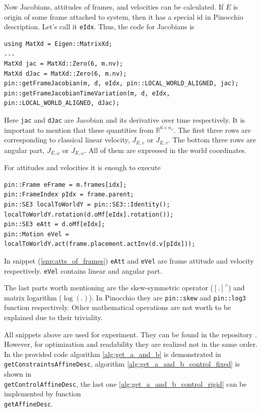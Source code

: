 Now Jacobians, attitudes of frames, and velocities can be calculated. If $E$ is 
origin of some frame attached to system, then it has a special id in Pinocchio 
description. Let's call it \texttt{eIdx}. Thus, the code for Jacobians is

\begin{lstlisting}[caption={Jacobians}, label=snp:jacs]
using MatXd = Eigen::MatrixXd;
...
MatXd jac = MatXd::Zero(6, m.nv);
MatXd dJac = MatXd::Zero(6, m.nv);
pin::getFrameJacobian(m, d, eIdx, pin::LOCAL_WORLD_ALIGNED, jac);
pin::getFrameJacobianTimeVariation(m, d, eIdx, pin::LOCAL_WORLD_ALIGNED, dJac);
\end{lstlisting}

Here \texttt{jac} and \texttt{dJac} are Jacobian and its derivative over time 
respectively. It is important to mention that these quantities from 
$\mathbb{R}^{6 \times n_v}$. The first three rows are corresponding to 
classical linear velocity, $J_{E,v}$ or $\dot{J}_{E,v}$. The bottom three rows are 
angular part, $J_{E,\omega}$ or $\dot{J}_{E,\omega}$. All of them are expressed 
in the world coordinates.

For attitudes and velocities it is enough to execute

\begin{lstlisting}[caption={Attitudes of frames}, label=snp:atts_of_frames]
pin::Frame eFrame = m.frames[idx];
pin::FrameIndex pIdx = frame.parent;
pin::SE3 localToWorldY = pin::SE3::Identity();
localToWorldY.rotation(d.oMf[eIdx].rotation());
pin::SE3 eAtt = d.oMf[eIdx]; 
pin::Motion eVel = localToWorldY.act(frame.placement.actInv(d.v[pIdx]));
\end{lstlisting}

In snippet (\ref{snp:atts_of_frames}) \texttt{eAtt} and \texttt{eVel} are 
frame attitude and velocity respectively. \texttt{eVel} contains linear and 
angular part.

The last parts worth mentioning are the skew-symmetric operator ($[.]^{\wedge}$) 
and matrix logarithm ($\log (.)$). In Pinocchio they are \texttt{pin::skew} and 
\texttt{pin::log3} function respectively. Other mathematical operations are not 
worth to be explained due to their triviality. 

All snippets above are used for experiment. They can be found in the repository 
\cite{experimentsRepo}. However, for optimization and readability they 
are realized not in the same order. In the provided code algorithm 
\ref{alg:get_a_and_b} is demonstrated in \texttt{getConstraintsAffineDesc}, 
algorithm \ref{alg:get_a_and_b_control_fixed} is shown in \\
\texttt{getControlAffineDesc}, the last one \ref{alg:get_a_and_b_control_rigid} 
can be implemented by function \\ \texttt{getAffineDesc}.


